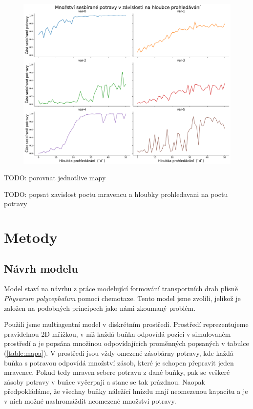 \documentclass[10pt,a4paper,twocolumn]{article}
\begin{document}
\begin{figure}[tb]
  \centering
  \includegraphics[width=0.98\linewidth]{images/search_depth_variants_separated.pdf}
  \caption{}
  \label{fig:search_depth_separated}
\end{figure}




TODO: porovnat jednotlive mapy

TODO: popsat zavislost poctu mravencu a hloubky prohledavani na poctu potravy



\section{Metody}

\subsection{Návrh modelu}
Model staví na návrhu z práce \citet{jones2010characteristics}
modelující formování transportních drah plísně \emph{Physarum polycephalum}
pomocí chemotaxe. Tento model jsme zvolili, jelikož je založen na podobných 
principech jako námi zkoumaný problém.

Použili jsme multiagentní model v diskrétním prostředí. Prostředí reprezentujeme 
pravidelnou 2D mřížkou, v níž každá buňka odpovídá pozici v simulovaném prostředí a je 
popsána množinou odpovídajících proměnných popsaných v tabulce (\ref{table:mapa}).
V prostředí jsou vždy omezené zásobárny potravy, kde každá buňka s potravou
odpovídá množství zásob, které je schopen přepravit jeden mravenec. Pokud
tedy mraven sebere potravu z dané buňky, pak se veškeré zásoby potravy v 
buňce vyčerpají a stane se tak prázdnou. Naopak předpokládáme, že všechny
buňky náležící hnízdu mají neomezenou kapacitu a je v nich možné 
nashromáždit neomezené množství potravy.
\end{document}
